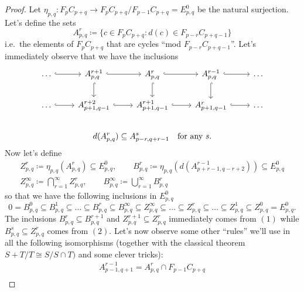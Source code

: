 \documentclass[a4paper]{article}
\theoremstyle{plain}
\theoremstyle{definition}
\begin{document}
		\begin{proof}
			Let $\eta_{p,q}\colon F_pC_{p+q} \to F_pC_{p+q}/F_{p-1}C_{p+q} = E^0_{p,q}$ be the natural surjection.	Let's define the sets
			\[
				A^r_{p,q} \coloneqq \{c \in F_pC_{p+q} : d(c) \in F_{p-r}C_{p+q-1}\}
			\]	
			i.e.\ the elements of $F_pC_{p+q}$ that are cycles ``mod $F_{p-r}C_{p+q-1}$''. Let's immediately observe that we have the inclusions
			\begin{gather}
				\label{eq:inclusions-As}
				\begin{tikzcd}[ampersand replacement = \&]
					\dots \arrow[hookrightarrow]{r} \& A^{r+1}_{p,q} \arrow[hookrightarrow]{r} \arrow[hookrightarrow]{d} \& A^r_{p,q} \arrow[hookrightarrow]{r} \arrow[hookrightarrow]{d}\& A^{r-1}_{p,q} \arrow[hookrightarrow]{r} \arrow[hookrightarrow]{d} \& \dots \\
					\dots \arrow[hookrightarrow]{r} \& A^{r+2}_{p+1,q-1} \arrow[hookrightarrow]{r} \& A^{r+1}_{p+1,q-1} \arrow[hookrightarrow]{r} \& A^{r}_{p+1,q-1} \arrow[hookrightarrow]{r} \& \dots \\
				\end{tikzcd} \\
				d(A^r_{p,q}) \subseteq A^s_{p-r, q+r-1} \quad \text{for any $s$.}
			\end{gather}
			Now let's define
			\begin{gather*}
				Z^r_{p,q} \coloneqq \eta_{p,q}(A^r_{p,q}) \subseteq E^0_{p,q}, \qquad B^r_{p,q} \coloneqq \eta_{p,q}(d(A^{r-1}_{p+r-1, q-r+2})) \subseteq E^0_{p,q}\\
				Z^{\infty}_{p,q} \coloneqq \bigcap_{r=1}^{\infty} Z^r_{p,q}, \qquad B^{\infty}_{p,q} \coloneqq \bigcup_{r=1}^{\infty} B^r_{p,q}
			\end{gather*}
			so that we have the following inclusions in $E^0_{p,q}$
			\[
				0 = B^0_{p,q} \subseteq B^1_{p,q} \subseteq \dots \subseteq B^r_{p,q} \subseteq B^{\infty}_{p,q} \subseteq Z^{\infty}_{p,q} \subseteq \dots \subseteq Z^r_{p,q} \subseteq \dots \subseteq Z^1_{p,q} \subseteq Z^0_{p,q} = E^0_{p,q}.
			\]
			The inclusions $B^r_{p,q} \subseteq B^{r+1}_{p,q}$ and $Z^{r+1}_{p,q} \subseteq Z^r_{p,q}$ immediately comes from $(1)$ while $B^s_{p,q} \subseteq Z^r_{p,q}$ comes from $(2)$.
			Let's now observe some other ``rules'' we'll use in all the following isomorphisms (together with the classical theorem $S+T/T \cong S/S\cap T)$ and some clever tricks):
			\begin{gather}
				\label{eqn:other-rules}
				A^{r-1}_{p-1, q+1} = A^r_{p,q} \cap F_{p-1}C_{p+q}\\

\end{gather}
\end{proof}
\end{document}
